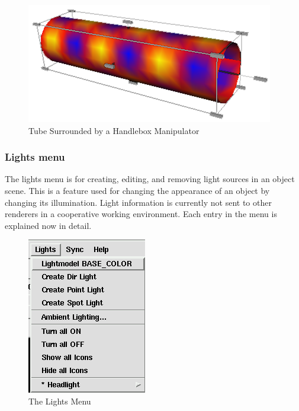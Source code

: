\begin{itemize}
 \latexonly
 \begin{figure}[htp]
  \begin{center}
   \includegraphics[scale=0.7]{renderer/pict/image21}
   \caption{Tube Surrounded by a Handlebox Manipulator}
	\label{fig68}
  \end{center}
 \end{figure}
 \endlatexonly
\end{itemize}

\clearpage


\subsubsection{Lights menu}

The lights menu is for creating, editing, and removing light sources
in an object scene. This is a feature used for changing the appearance
of an object by changing its illumination. Light information is
currently not sent to other renderers in a cooperative working environment.
Each entry in the menu is explained now in detail.

 \latexonly
 \begin{figure}[htp]
  \begin{center}
   \includegraphics[scale=0.7]{renderer/pict/image22}
   \caption{The Lights Menu}
	\label{fig69}
  \end{center}
 \end{figure}
 \endlatexonly

